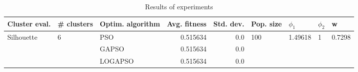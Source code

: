 \begin{table}
\centering
\caption{Results of experiments}
\begin{tabular}{lllrrllll}
\toprule
              Cluster eval. &        \# clusters & Optim. algorithm &  Avg. fitness &  Std. dev. &            Pop. size &               $\phi_{1}$ &         $\phi_{2}$ &                       w \\
\midrule
\multirow{3}{*}{Silhouette} & \multirow{3}{*}{6} &              PSO &      0.515634 &        0.0 & \multirow{3}{*}{100} & \multirow{3}{*}{1.49618} & \multirow{3}{*}{1} & \multirow{3}{*}{0.7298} \\
                            &                    &            GAPSO &      0.515634 &        0.0 &                      &                          &                    &                         \\
                            &                    &          LOGAPSO &      0.515634 &        0.0 &                      &                          &                    &                         \\
\bottomrule
\end{tabular}
\end{table}
